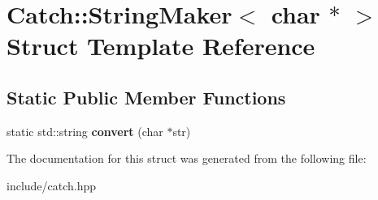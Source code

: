 \hypertarget{structCatch_1_1StringMaker_3_01char_01_5_01_4}{}\section{Catch\+:\+:String\+Maker$<$ char $\ast$ $>$ Struct Template Reference}
\label{structCatch_1_1StringMaker_3_01char_01_5_01_4}
\subsection*{Static Public Member Functions}
\begin{DoxyCompactItemize}
\item 
static std\+::string {\bfseries convert} (char $\ast$str)\hypertarget{structCatch_1_1StringMaker_3_01char_01_5_01_4_a33049e24281ea6fba48bd8817bdd52bd}{}\label{structCatch_1_1StringMaker_3_01char_01_5_01_4_a33049e24281ea6fba48bd8817bdd52bd}

\end{DoxyCompactItemize}


The documentation for this struct was generated from the following file\+:\begin{DoxyCompactItemize}
\item 
include/catch.\+hpp\end{DoxyCompactItemize}
